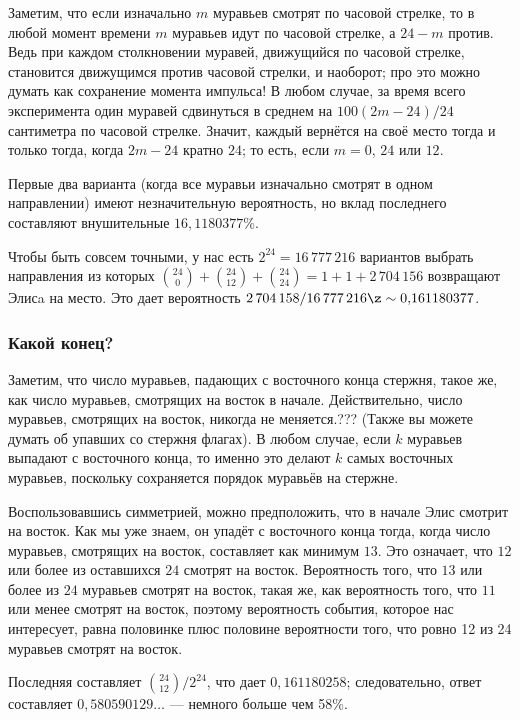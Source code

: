 Заметим, что если изначально $m$ муравьев смотрят по часовой стрелке, то в любой момент времени $m$ муравьев идут по часовой стрелке, а $24 - m$ против.
Ведь при каждом столкновении муравей, движущийся по часовой стрелке, становится движущимся против часовой стрелки, и наоборот;
про это можно думать как сохранение момента импульса!
В любом случае, за время всего эксперимента один муравей сдвинуться в среднем на $100(2m - 24)/24$ сантиметра по часовой стрелке.
Значит, каждый вернётся на своё место тогда и только тогда, когда $2m - 24$ кратно $24$; то есть, если $m = 0$, $24$ или $12$.

Первые два варианта (когда все муравьи изначально смотрят в одном направлении) имеют незначительную вероятность, но вклад последнего составляют внушительные $16,1180377\%$.

Чтобы быть совсем точными, у нас есть $2^{24}=16\,777\,216$ вариантов выбрать направления из которых  $\binom{24}0+\binom{24}{12}+\binom{24}{24}=1+1+2\,704\,156$ возвращают Элисa на место.
Это дает вероятность $2\,704\,158/16\,777\,216 \z\sim 0{,}161180377$.

\subsubsection*{Какой конец?}

Заметим, что число муравьев, падающих с восточного конца стержня, такое же, как число муравьев, смотрящих на восток в начале.
Действительно, число муравьев, смотрящих на восток, никогда не меняется.???
(Также вы можете думать об упавших со стержня флагах).
В любом случае, если $k$ муравьев выпадают с восточного конца, то именно это делают $k$ самых восточных муравьев, поскольку сохраняется порядок муравьёв на стержне.

Воспользовавшись симметрией, можно предположить, что в начале Элис смотрит на восток.
Как мы уже знаем, он упадёт с восточного конца тогда, когда число муравьев, смотрящих на восток, составляет как минимум $13$. Это означает, что $12$ или более из оставшихся $24$ смотрят на восток.
Вероятность того, что $13$ или более из $24$ муравьев смотрят на восток, такая же, как вероятность того, что $11$ или менее смотрят на восток, поэтому вероятность события, которое нас интересует, равна половинке плюс половине вероятности того, что ровно 12 из
24 муравьев смотрят на восток.

Последняя составляет $\binom{24}{12}/2^{24}$, что дает $0{,}161180258$;
следовательно, ответ составляет $0{,}580590129\dots$ --- немного больше чем 58\%.


